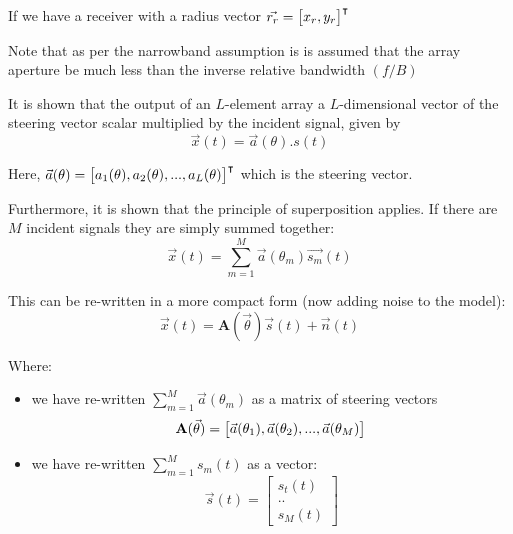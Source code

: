 If we have a receiver with a radius vector \(\vec{r_r} = \begin{bmatrix} x_r, y_r \end{bmatrix}^\intercal\)

Note that as per the narrowband assumption is is assumed that the array aperture be much less than the inverse relative bandwidth \((f/B)\)

It is shown that the output of an \(L\)-element array a \(L\)-dimensional vector of the steering vector scalar multiplied by the incident signal, given by
\begin{equation}
  \vec{x}(t) = \vec{a}(\theta).s(t)
\end{equation}

Here, \(\vec{a}(\theta) = \begin{bmatrix} a_1(\theta), a_2(\theta), ... , a_L(\theta) \end{bmatrix}^\intercal\) which is the steering vector.

  Furthermore, it is shown that the principle of superposition applies. If there are \(M\) incident signals they are simply summed together:
\begin{equation}
  \vec{x}(t) = \sum_{m=1}^{M} \vec{a}(\theta_m)\vec{s_m}(t)
\end{equation}

This can be re-written in a more compact form (now adding noise to the model):
\begin{equation}
  \vec{x}(t) = \mathbf{A}(\vec{\theta})\vec{s}(t) + \vec{n}(t)
\end{equation}

Where:
\begin{itemize} 
  \item we have re-written \(\sum_{m=1}^{M}\vec{a}(\theta_m)\) as a matrix of steering vectors
\begin{equation} 
  \mathbf{A}(\vec{\theta}) = \begin{bmatrix} \vec{a}(\theta_1), \vec{a}(\theta_2), ..., \vec{a}(\theta_M) \end{bmatrix} \\
\end{equation}
  \item we have re-written  \(\sum_{m=1}^{M}s_m(t)\) as a vector:
\begin{equation}
  \vec{s}(t) = \begin{bmatrix} s_t(t) \\ .. \\ s_M(t) \end{bmatrix}
\end{equation}
\end{itemize}
